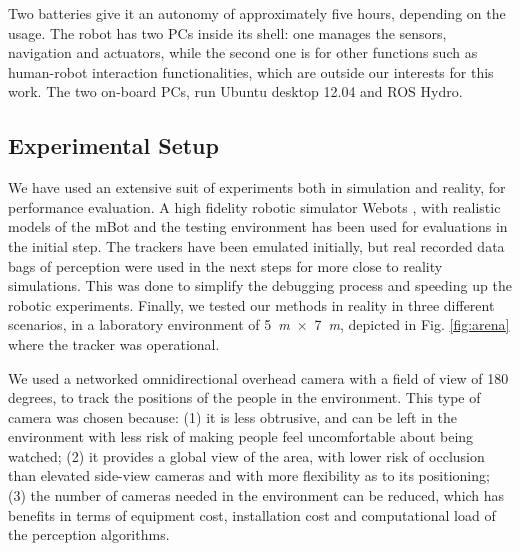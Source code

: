 Two batteries give it an autonomy of approximately five hours, depending on the usage.
The robot has two PCs inside its shell: one manages the sensors, navigation and actuators, while the second one is for other functions such as human-robot interaction functionalities, which are outside our interests for this work. The two on-board PCs, run Ubuntu desktop 12.04 and ROS Hydro. 


\subsection{Experimental Setup}
\label{sec:Experimental_setup}


We have used an extensive suit of experiments both in simulation and reality, for performance evaluation. A high fidelity robotic simulator Webots \cite{michel1998webots}, with realistic models of the mBot and the testing environment has been used for evaluations in the initial step. The trackers have been emulated initially, but real recorded data bags of perception were used in the next steps for more close to reality simulations. This was done to simplify the debugging process and speeding up the robotic experiments. %
Finally, we tested our methods in reality in three different scenarios, in a laboratory environment of 5~\textit{m}~$\times$~7~\textit{m}, depicted in Fig. \ref{fig:arena} where the tracker was operational.
 

We used a networked omnidirectional overhead camera with a field of view of 180 degrees, to track the positions of the people in the environment. This type of camera was chosen because: (1) it is less obtrusive, and can be left in the environment with less risk of making people feel uncomfortable about being watched; 
(2) it provides a global view of the area, with lower risk of occlusion than elevated side-view cameras and with more flexibility as to its positioning; (3) the number of cameras needed in the environment can be reduced, which has benefits in terms of equipment cost, installation cost and computational load of the perception algorithms. 


